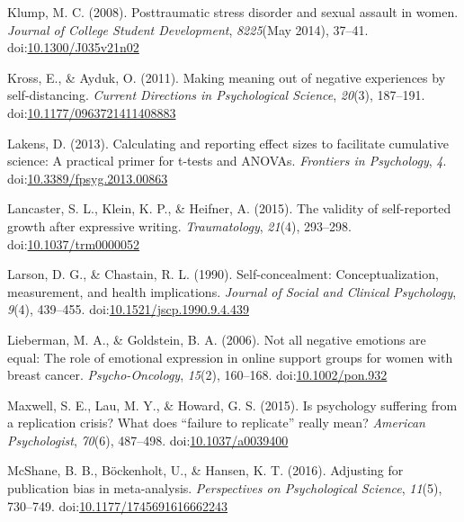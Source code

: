 \documentclass[man, mask]{apa6}
\theoremstyle{definition}
\theoremstyle{definition}
\theoremstyle{definition}
\theoremstyle{remark}
\begin{document}
\hypertarget{ref-Klump2008}{}
Klump, M. C. (2008). Posttraumatic stress disorder and sexual assault in
women. \emph{Journal of College Student Development}, \emph{8225}(May
2014), 37--41.
doi:\href{https://doi.org/10.1300/J035v21n02}{10.1300/J035v21n02}

\hypertarget{ref-Kross2011}{}
Kross, E., \& Ayduk, O. (2011). Making meaning out of negative
experiences by self-distancing. \emph{Current Directions in
Psychological Science}, \emph{20}(3), 187--191.
doi:\href{https://doi.org/10.1177/0963721411408883}{10.1177/0963721411408883}

\hypertarget{ref-Lakens2013}{}
Lakens, D. (2013). Calculating and reporting effect sizes to facilitate
cumulative science: A practical primer for t-tests and ANOVAs.
\emph{Frontiers in Psychology}, \emph{4}.
doi:\href{https://doi.org/10.3389/fpsyg.2013.00863}{10.3389/fpsyg.2013.00863}

\hypertarget{ref-Lancaster2015}{}
Lancaster, S. L., Klein, K. P., \& Heifner, A. (2015). The validity of
self-reported growth after expressive writing. \emph{Traumatology},
\emph{21}(4), 293--298.
doi:\href{https://doi.org/10.1037/trm0000052}{10.1037/trm0000052}

\hypertarget{ref-Larson1990a}{}
Larson, D. G., \& Chastain, R. L. (1990). Self-concealment:
Conceptualization, measurement, and health implications. \emph{Journal
of Social and Clinical Psychology}, \emph{9}(4), 439--455.
doi:\href{https://doi.org/10.1521/jscp.1990.9.4.439}{10.1521/jscp.1990.9.4.439}

\hypertarget{ref-Lieberman2006}{}
Lieberman, M. A., \& Goldstein, B. A. (2006). Not all negative emotions
are equal: The role of emotional expression in online support groups for
women with breast cancer. \emph{Psycho-Oncology}, \emph{15}(2),
160--168. doi:\href{https://doi.org/10.1002/pon.932}{10.1002/pon.932}

\hypertarget{ref-Maxwell2015}{}
Maxwell, S. E., Lau, M. Y., \& Howard, G. S. (2015). Is psychology
suffering from a replication crisis? What does ``failure to replicate''
really mean? \emph{American Psychologist}, \emph{70}(6), 487--498.
doi:\href{https://doi.org/10.1037/a0039400}{10.1037/a0039400}

\hypertarget{ref-McShane2016}{}
McShane, B. B., Böckenholt, U., \& Hansen, K. T. (2016). Adjusting for
publication bias in meta-analysis. \emph{Perspectives on Psychological
Science}, \emph{11}(5), 730--749.
doi:\href{https://doi.org/10.1177/1745691616662243}{10.1177/1745691616662243}
\end{document}
